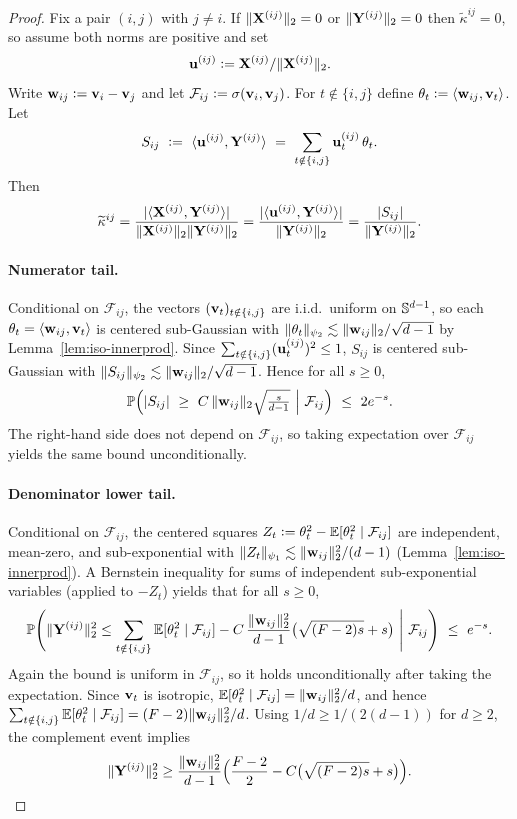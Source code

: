 \begin{proof}
Fix a pair $(i,j)$ with $j\neq i$.
If $\|\mathbf{X}^{(ij)}\|_{2}=0$ or $\|\mathbf{Y}^{(ij)}\|_{2}=0$ then $\widetilde{\kappa}^{ij}=0$, so assume both norms are positive and set
\[
{\mathbf{u}}^{(ij)}\vcentcolon= \mathbf{X}^{(ij)}/\|\mathbf{X}^{(ij)}\|_{2}.
\]
Write ${\mathbf{w}}_{ij}\vcentcolon= {\mathbf{v}}_{i}-{\mathbf{v}}_{j}$ and let $\mathcal{F}_{ij}\vcentcolon= \sigma({\mathbf{v}}_{i},{\mathbf{v}}_{j})$.
For $t\notin\{i,j\}$ define $\theta_{t}\vcentcolon= \langle {{\mathbf{w}}_{ij}}, {{\mathbf{v}}_t} \rangle$. Let
\[
S_{ij}\ \defeq\ \ip{\vu^{(ij)}}{\vY^{(ij)}}\ =\ \sum_{t\notin\{i,j\}}\vu^{(ij)}_{t}\,\theta_{t}.
\]
Then
\[
\widetilde{\kappa}^{ij}=\frac{|\langle {\mathbf{X}^{(ij)}}, {\mathbf{Y}^{(ij)}} \rangle|}{\|\mathbf{X}^{(ij)}\|_{2}\|\mathbf{Y}^{(ij)}\|_2}
=\frac{|\langle {{\mathbf{u}}^{(ij)}}, {\mathbf{Y}^{(ij)}} \rangle|}{\|\mathbf{Y}^{(ij)}\|_2}
=\frac{|S_{ij}|}{\|\mathbf{Y}^{(ij)}\|_2}.
\]

\paragraph{Numerator tail.}
Conditional on $\mathcal{F}_{ij}$, the vectors $({\mathbf{v}}_{t})_{t\notin\{i,j\}}$ are i.i.d.\ uniform on $\mathbb{S}^{d-1}$,
so each $\theta_{t}=\langle {{\mathbf{w}}_{ij}}, {{\mathbf{v}}_t} \rangle$ is centered sub-Gaussian with
$\|\theta_{t}\|_{\psi_2}\lesssim \|{\mathbf{w}}_{ij}\|_{2}/\sqrt{d-1}$ by Lemma~\ref{lem:iso-innerprod}.
Since $\sum_{t\notin\{i,j\}}({\mathbf{u}}^{(ij)}_{t})^2\le 1$, $S_{ij}$ is centered sub-Gaussian with
$\|S_{ij}\|_{\psi_2}\lesssim \|{\mathbf{w}}_{ij}\|_{2}/\sqrt{d-1}$. Hence for all $s\ge 0$,
\[
\Pbb\Big(|S_{ij}|\ \ge\ C\,\|\vw_{ij}\|_{2}\sqrt{\tfrac{s}{d-1}}\ \Big|\ \mathcal{F}_{ij}\Big)\ \le\ 2e^{-s}.
\]
The right-hand side does not depend on $\mathcal{F}_{ij}$, so taking expectation over $\mathcal{F}_{ij}$ yields the same bound unconditionally.

\paragraph{Denominator lower tail.}
Conditional on $\mathcal{F}_{ij}$, the centered squares
$Z_{t}\vcentcolon= \theta_{t}^2-\mathbb{E}[\theta_{t}^2\mid\mathcal{F}_{ij}]$ are independent, mean-zero, and sub-exponential with
$\|Z_{t}\|_{\psi_1}\lesssim \|{\mathbf{w}}_{ij}\|_{2}^2/(d-1)$ (Lemma~\ref{lem:iso-innerprod}).
A Bernstein inequality for sums of independent sub-exponential variables (applied to $-Z_{t}$) yields that for all $s\ge 0$,
\[
\mathbb{P}\Bigg(
\|\mathbf{Y}^{(ij)}\|_{2}^2
\le
\sum_{t\notin\{i,j\}}\mathbb{E}[\theta_{t}^2\mid\mathcal{F}_{ij}]
-
C\,\frac{\|{\mathbf{w}}_{ij}\|_{2}^2}{d-1}\big(\sqrt{(F-2)s}+s\big)
\ \Bigg|\ \mathcal{F}_{ij}
\Bigg)
\ \le\ e^{-s}.
\]
Again the bound is uniform in $\mathcal{F}_{ij}$, so it holds unconditionally after taking the expectation.
Since ${\mathbf{v}}_{t}$ is isotropic, $\mathbb{E}[\theta_{t}^2\mid\mathcal{F}_{ij}]=\|{\mathbf{w}}_{ij}\|_{2}^2/d$, and hence
$\sum_{t\notin\{i,j\}}\mathbb{E}[\theta_{t}^2\mid\mathcal{F}_{ij}]=(F-2)\|{\mathbf{w}}_{ij}\|_{2}^2/d$.
Using $1/d\ge 1/(2(d-1))$ for $d\ge 2$, the complement event implies
\[
\|\mathbf{Y}^{(ij)}\|_{2}^2
\ge
\frac{\|{\mathbf{w}}_{ij}\|_{2}^2}{d-1}\Big(\frac{F-2}{2}-C\big(\sqrt{(F-2)s}+s\big)\Big).
\]


\end{proof}
